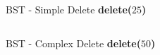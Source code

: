 \begin{frame}{BST - Simple Delete}
\textbf{delete($25$)}
\begin{figure}[b]
\begin{columns}
\begin{column}[t]{0.48\textwidth}

\end{column}
\pause
\pause
\begin{column}[t]{0.5\textwidth}

\end{column}
\end{columns}
\end{figure}
\end{frame}

\begin{frame}{BST - Complex Delete}
\textbf{delete($50$)}
\begin{figure}[b]
\begin{columns}
\begin{column}[t]{0.33\textwidth}

\end{column}
\pause
\pause
\pause
\begin{column}[t]{0.33\textwidth}

\end{column}
\pause
\begin{column}[t]{0.33\textwidth}

\end{column}
\end{columns}
\end{figure}
\end{frame}